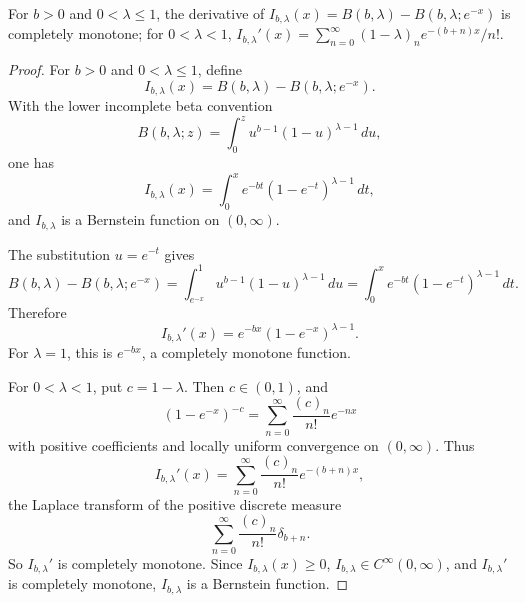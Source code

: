 \begin{lemma}
\label{res:incomplete-beta-tail-derivative-cm-certificate}
For \(b>0\) and \(0<\lambda\le1\), the derivative of \(I_{b,\lambda}(x)=B(b,\lambda)-B(b,\lambda;e^{-x})\) is completely monotone; for \(0<\lambda<1\), \(I_{b,\lambda}'(x)=\sum_{n=0}^\infty (1-\lambda)_n e^{-(b+n)x}/n!\).
\end{lemma}
\begin{proof}
For \(b>0\) and \(0<\lambda\le1\), define
\[
I_{b,\lambda}(x)=B(b,\lambda)-B(b,\lambda;e^{-x}).
\]
With the lower incomplete beta convention
\[
B(b,\lambda;z)=\int_0^z u^{b-1}(1-u)^{\lambda-1}\,du,
\]
one has
\[
I_{b,\lambda}(x)=\int_0^x e^{-bt}(1-e^{-t})^{\lambda-1}\,dt,
\]
and \(I_{b,\lambda}\) is a Bernstein function on \((0,\infty)\).

The substitution \(u=e^{-t}\) gives
\[
B(b,\lambda)-B(b,\lambda;e^{-x})
=\int_{e^{-x}}^1u^{b-1}(1-u)^{\lambda-1}\,du
=\int_0^x e^{-bt}(1-e^{-t})^{\lambda-1}\,dt.
\]
Therefore
\[
I_{b,\lambda}'(x)=e^{-bx}(1-e^{-x})^{\lambda-1}.
\]
For \(\lambda=1\), this is \(e^{-bx}\), a completely monotone function.

For \(0<\lambda<1\), put \(c=1-\lambda\). Then \(c\in(0,1)\), and
\[
(1-e^{-x})^{-c}
=\sum_{n=0}^\infty \frac{(c)_n}{n!}e^{-nx}
\]
with positive coefficients and locally uniform convergence on \((0,\infty)\). Thus
\[
I_{b,\lambda}'(x)
=\sum_{n=0}^\infty \frac{(c)_n}{n!}e^{-(b+n)x},
\]
the Laplace transform of the positive discrete measure
\[
\sum_{n=0}^\infty \frac{(c)_n}{n!}\delta_{b+n}.
\]
So \(I_{b,\lambda}'\) is completely monotone. Since \(I_{b,\lambda}(x)\ge0\), \(I_{b,\lambda}\in C^\infty(0,\infty)\), and \(I_{b,\lambda}'\) is completely monotone, \(I_{b,\lambda}\) is a Bernstein function.
\end{proof}

